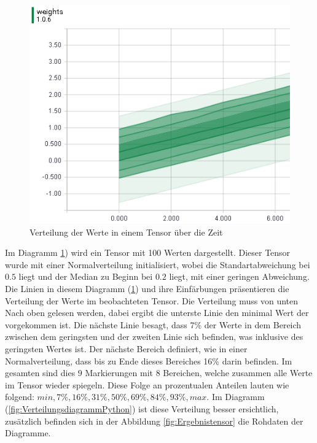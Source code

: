 \begin{figure}
	\centering
	\includegraphics[scale=0.9]{images/Distripution-small.png}
	\caption{Verteilung der Werte in einem Tensor über die Zeit}
	\label{fig:Verteilungsdiagram}
\end{figure}

\noindent
Im Diagramm \ref{fig:Verteilungsdiagram}) wird ein Tensor mit 100 Werten dargestellt. 
Dieser Tensor wurde mit einer Normalverteilung initialisiert, wobei die Standartabweichung bei $0.5$ liegt und der Median zu Beginn bei $0.2$ liegt, mit einer geringen Abweichung. 
Die Linien in diesem Diagramm (\ref{fig:Verteilungsdiagram}) und ihre Einfärbungen präsentieren die Verteilung der Werte im beobachteten Tensor. 
Die Verteilung muss von unten Nach oben gelesen werden, dabei ergibt die unterste Linie den minimal Wert der vorgekommen ist. 
Die nächste Linie besagt, dass 7\% der Werte in dem Bereich zwischen dem geringsten und der zweiten Linie sich befinden, was inklusive des geringsten Wertes ist.  
Der nächste Bereich definiert, wie in einer Normalverteilung, dass bis zu Ende dieses Bereiches 16\% darin befinden. 
Im gesamten sind dies $9$ Markierungen mit 8 Bereichen, welche zusammen alle Werte im Tensor wieder spiegeln. 
Diese Folge an prozentualen Anteilen lauten wie folgend: $min, 7\%, 16\%, 31\%, 50\%, 69\%, 84\%, 93\%, max$. 
Im Diagramm (\ref{fig:VerteilungsdiagrammPython}) ist diese Verteilung besser ersichtlich, zusätzlich befinden sich in der Abbildung \ref{fig:Ergebnistensor} die Rohdaten der Diagramme. 


